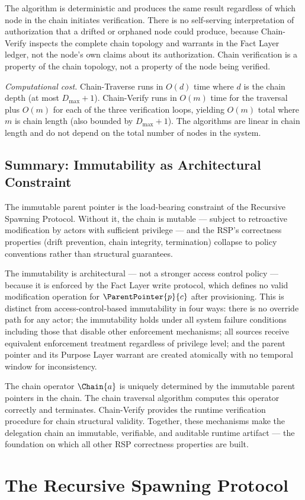 \documentclass[12pt]{article}
\begin{document}
The algorithm is deterministic and produces the same result regardless of which node in the chain initiates verification. There is no self-serving interpretation of authorization that a drifted or orphaned node could produce, because Chain-Verify inspects the complete chain topology and warrants in the Fact Layer ledger, not the node's own claims about its authorization. Chain verification is a property of the chain topology, not a property of the node being verified.

\textit{Computational cost.} Chain-Traverse runs in $O(d)$ time where $d$ is the chain depth (at most $D_{\max} + 1$). Chain-Verify runs in $O(m)$ time for the traversal plus $O(m)$ for each of the three verification loops, yielding $O(m)$ total where $m$ is chain length (also bounded by $D_{\max} + 1$). The algorithms are linear in chain length and do not depend on the total number of nodes in the system.

\subsection{Summary: Immutability as Architectural Constraint}
\label{sec:immutability-summary}

The immutable parent pointer is the load-bearing constraint of the Recursive Spawning Protocol. Without it, the chain is mutable — subject to retroactive modification by actors with sufficient privilege — and the RSP's correctness properties (drift prevention, chain integrity, termination) collapse to policy conventions rather than structural guarantees.

The immutability is architectural — not a stronger access control policy — because it is enforced by the Fact Layer write protocol, which defines no valid modification operation for $\ParentPointer{p}{c}$ after provisioning. This is distinct from access-control-based immutability in four ways: there is no override path for any actor; the immutability holds under all system failure conditions including those that disable other enforcement mechanisms; all sources receive equivalent enforcement treatment regardless of privilege level; and the parent pointer and its Purpose Layer warrant are created atomically with no temporal window for inconsistency.

The chain operator $\Chain{a}$ is uniquely determined by the immutable parent pointers in the chain. The chain traversal algorithm computes this operator correctly and terminates. Chain-Verify provides the runtime verification procedure for chain structural validity. Together, these mechanisms make the delegation chain an immutable, verifiable, and auditable runtime artifact — the foundation on which all other RSP correctness properties are built.\section{The Recursive Spawning Protocol}
\label{sec:rs-protocol}
\end{document}
